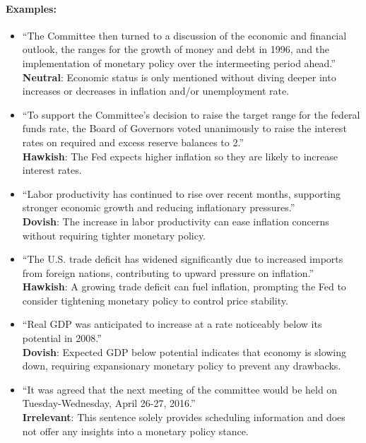 \paragraph{Examples: }
\begin{itemize}
    \item ``The Committee then turned to a discussion of the economic and financial outlook, the ranges for the growth of money and debt in 1996, and the implementation of monetary policy over the intermeeting period ahead.''\\
    \textbf{Neutral}: Economic status is only mentioned without diving deeper into increases or decreases in inflation and/or unemployment rate.
    
    \item ``To support the Committee’s decision to raise the target range for the federal funds rate, the Board of Governors voted unanimously to raise the interest rates on required and excess reserve balances to 2.''\\
    \textbf{Hawkish}: The Fed expects higher inflation so they are likely to increase interest rates.
    
    \item ``Labor productivity has continued to rise over recent months, supporting stronger economic growth and reducing inflationary pressures.''\\
    \textbf{Dovish}: The increase in labor productivity can ease inflation concerns without requiring tighter monetary policy.
    
    \item ``The U.S. trade deficit has widened significantly due to increased imports from foreign nations, contributing to upward pressure on inflation.''\\
    \textbf{Hawkish}: A growing trade deficit can fuel inflation, prompting the Fed to consider tightening monetary policy to control price stability.
    
    \item ``Real GDP was anticipated to increase at a rate noticeably below its potential in 2008.''\\
    \textbf{Dovish}: Expected GDP below potential indicates that economy is slowing down, requiring expansionary monetary policy to prevent any drawbacks.


    \item ``It was agreed that the next meeting of the committee would be held on Tuesday-Wednesday, April 26-27, 2016.''\\
    \textbf{Irrelevant}: This sentence solely provides scheduling information and does not offer any insights into a monetary policy stance.
\end{itemize}

